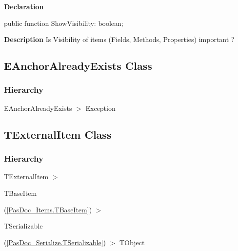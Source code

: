 \documentclass{report}
\newif\ifpdf
\begin{document}
\label{PasDoc_Items.TPasCio-ShowVisibility}
\begin{list}{}{
\setlength{\itemindent}{0cm}
\setlength{\listparindent}{0cm}
\setlength{\leftmargin}{\evensidemargin}
\addtolength{\leftmargin}{\tmplength}
\settowidth{\labelsep}{X}
\addtolength{\leftmargin}{\labelsep}
\setlength{\labelwidth}{\tmplength}
}
\item[\textbf{Declaration}\hfill]
\ifpdf
\begin{flushleft}
\fi
\begin{ttfamily}
public function ShowVisibility: boolean;\end{ttfamily}

\ifpdf
\end{flushleft}
\fi

\par
\item[\textbf{Description}]
Is Visibility of items (Fields, Methods, Properties) important ?

\end{list}
\ifpdf
\subsection*{\large{\textbf{EAnchorAlreadyExists Class}}\normalsize\hspace{1ex}\hrulefill}
\else
\subsection*{EAnchorAlreadyExists Class}
\fi
\label{PasDoc_Items.EAnchorAlreadyExists}
\subsubsection*{\large{\textbf{Hierarchy}}\normalsize\hspace{1ex}\hfill}
EAnchorAlreadyExists {$>$} Exception
\ifpdf
\subsection*{\large{\textbf{TExternalItem Class}}\normalsize\hspace{1ex}\hrulefill}
\else
\subsection*{TExternalItem Class}
\fi
\label{PasDoc_Items.TExternalItem}
\subsubsection*{\large{\textbf{Hierarchy}}\normalsize\hspace{1ex}\hfill}
TExternalItem {$>$} \begin{ttfamily}TBaseItem\end{ttfamily}(\ref{PasDoc_Items.TBaseItem}) {$>$} \begin{ttfamily}TSerializable\end{ttfamily}(\ref{PasDoc_Serialize.TSerializable}) {$>$} 
TObject
\end{document}
